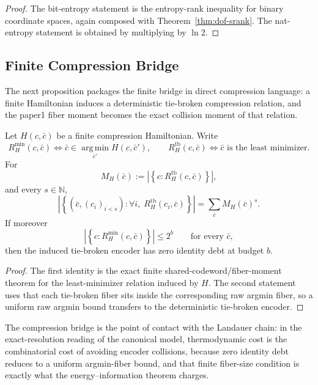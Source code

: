 \begin{proof}
The bit-entropy statement is the entropy-rank inequality for binary coordinate spaces, again composed with Theorem~\ref{thm:dof-srank}. The nat-entropy statement is obtained by multiplying by $\ln 2$.
\end{proof}

\subsection{Finite Compression Bridge}

The next proposition packages the finite bridge in direct compression language: a finite Hamiltonian induces a deterministic tie-broken compression relation, and the paper1 fiber moment becomes the exact collision moment of that relation.

\begin{proposition}\label{prop:finite-compression-bridge}
Let $H(c,\bar c)$ be a finite compression Hamiltonian. Write
\[
R_H^{\min}(c,\bar c) \iff \bar c \in \operatorname*{arg\,min}_{\bar c'} H(c,\bar c'),
\qquad
R_H^{\mathrm{tb}}(c,\bar c) \iff \bar c \text{ is the least minimizer.}
\]
For
\[
M_H(\bar c) := \left|\left\{c : R_H^{\mathrm{tb}}(c,\bar c)\right\}\right|,
\]
and every $s \in \mathbb{N}$,
\[
\left|\left\{(\bar c,(c_i)_{i < s}) : \forall i,\; R_H^{\mathrm{tb}}(c_i,\bar c)\right\}\right|
=
\sum_{\bar c} M_H(\bar c)^s.
\]
If moreover
\[
\left|\left\{c : R_H^{\min}(c,\bar c)\right\}\right| \le 2^b
\qquad\text{for every } \bar c,
\]
then the induced tie-broken encoder has zero identity debt at budget $b$.
\end{proposition}

\begin{proof}
The first identity is the exact finite shared-codeword/fiber-moment theorem for the least-minimizer relation induced by $H$. The second statement uses that each tie-broken fiber sits inside the corresponding raw argmin fiber, so a uniform raw argmin bound transfers to the deterministic tie-broken encoder.
\end{proof}

The compression bridge is the point of contact with the Landauer chain: in the exact-resolution reading of the canonical model, thermodynamic cost is the combinatorial cost of avoiding encoder collisions, because zero identity debt reduces to a uniform argmin-fiber bound, and that finite fiber-size condition is exactly what the energy--information theorem charges.

